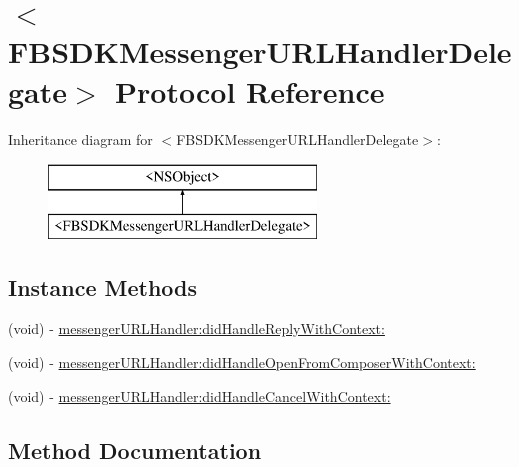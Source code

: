\hypertarget{protocol_f_b_s_d_k_messenger_u_r_l_handler_delegate-p}{}\section{$<$F\+B\+S\+D\+K\+Messenger\+U\+R\+L\+Handler\+Delegate$>$ Protocol Reference}
\label{protocol_f_b_s_d_k_messenger_u_r_l_handler_delegate-p}
Inheritance diagram for $<$F\+B\+S\+D\+K\+Messenger\+U\+R\+L\+Handler\+Delegate$>$\+:\begin{figure}[H]
\begin{center}
\leavevmode
\includegraphics[height=2.000000cm]{protocol_f_b_s_d_k_messenger_u_r_l_handler_delegate-p}
\end{center}
\end{figure}
\subsection*{Instance Methods}
\begin{DoxyCompactItemize}
\item 
(void) -\/ \hyperlink{protocol_f_b_s_d_k_messenger_u_r_l_handler_delegate-p_a4671928458982fc91776c967ed024d0a}{messenger\+U\+R\+L\+Handler\+:did\+Handle\+Reply\+With\+Context\+:}
\item 
(void) -\/ \hyperlink{protocol_f_b_s_d_k_messenger_u_r_l_handler_delegate-p_aabad801769fd503a4a073aefbf88d285}{messenger\+U\+R\+L\+Handler\+:did\+Handle\+Open\+From\+Composer\+With\+Context\+:}
\item 
(void) -\/ \hyperlink{protocol_f_b_s_d_k_messenger_u_r_l_handler_delegate-p_afc171e3f8e934b7e78cf8591e9a3644f}{messenger\+U\+R\+L\+Handler\+:did\+Handle\+Cancel\+With\+Context\+:}
\end{DoxyCompactItemize}


\subsection{Method Documentation}
\hypertarget{protocol_f_b_s_d_k_messenger_u_r_l_handler_delegate-p_afc171e3f8e934b7e78cf8591e9a3644f}{}
